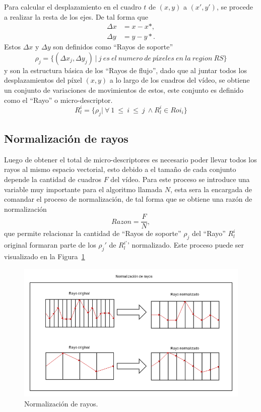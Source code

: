 	Para calcular el desplazamiento en el cuadro $t$ de $(x,y)$ a $(x',y')$, se procede a realizar la resta de los ejes. De tal forma que
	\begin{align}
		\Delta x &= x-x*,\\ 
		\Delta y &= y-y*.
	\end{align}
		Estos $ \Delta x$ y $ \Delta y$ son definidos como ``Rayos de soporte''
	\begin{equation}
		\rho_j = \{(\Delta x_j, \Delta y_j)~|~j~es~el~numero~de~píxeles~en~la~region~RS \}
	\end{equation}		
	 y son la estructura básica de los ``Rayos de flujo'', dado que al juntar todos los desplazamientos del píxel $(x,y)$ a lo largo de los cuadros del vídeo, se obtiene un conjunto de variaciones de movimientos de estos, este conjunto es definido como el ``Rayo'' o micro-descriptor.
	\begin{equation}
		R^i_l	 = \{\rho_j | ~\forall ~1~\leq~i~\le~j\ \wedge R^i_l \in Roi_i \}
	\end{equation}
		
		
	\subsection{Normalización de rayos}
	\label{algoritmo:normalizacion}
	Luego de obtener el total de micro-descriptores es necesario poder llevar todos los rayos al mismo espacio vectorial, esto debido a el tamaño de cada conjunto depende la cantidad de cuadros $F$ del vídeo. Para este proceso se introduce una variable muy importante para el algoritmo llamada $N$, esta sera la encargada de comandar el proceso de normalización, de tal forma que se obtiene una razón de normalización
	\begin{equation}
		Razon = \frac{F}{N},
	\end{equation}
	que permite relacionar la cantidad de ``Rayos de soporte'' $\rho_j$ del ``Rayo'' $R^i_l$ original formaran parte de los $\rho_j '$ de $R^{i'}_l$' normalizado. Este proceso puede ser visualizado en la Figura~\ref{algoritmo:fig:normalizacion}
	
	\begin{figure}[!]
		\centering
  		\label{algoritmo:fig:normalizacion}
    		\includegraphics[width=1\textwidth]{Figuras/Diagramas/normalizacion_de_rayos.png}
  		\caption{Normalización de rayos.}
	\end{figure}	

